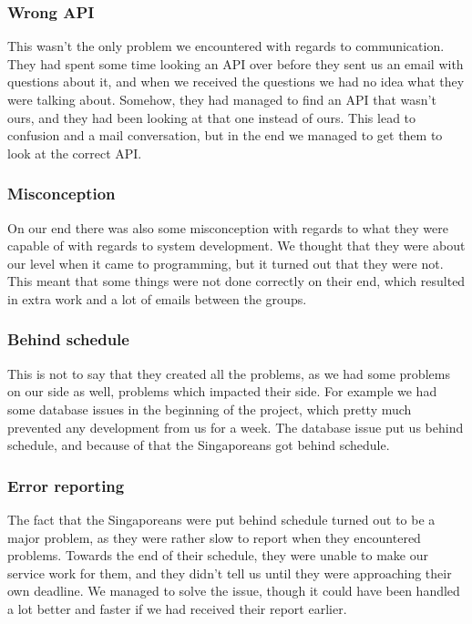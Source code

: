 \subsubsection{Wrong API}
\label{Collaboration_SMU_Conflicts_API}
This wasn't the only problem we encountered with regards to communication. They had spent some time looking an API over before they sent us an email with questions about it, and when we received the questions we had no idea what they were talking about. Somehow, they had managed to find an API that wasn't ours, and they had been looking at that one instead of ours. This lead to confusion and a mail conversation, but in the end we managed to get them to look at the correct API.

\subsubsection{Misconception}
\label{Collaboration_SMU_Conflicts_Misconception}
On our end there was also some misconception with regards to what they were capable of with regards to system development. We thought that they were about our level when it came to programming, but it turned out that they were not. This meant that some things were not done correctly on their end, which resulted in extra work and a lot of emails between the groups.

\subsubsection{Behind schedule}
\label{Collaboration_SMU_Conflicts_Schedule}
This is not to say that they created all the problems, as we had some problems on our side as well, problems which impacted their side. For example we had some database issues in the beginning of the project, which pretty much prevented any development from us for a week. The database issue put us behind schedule, and because of that the Singaporeans got behind schedule.

\subsubsection{Error reporting}
\label{Collaboration_SMU_Conflicts_error}
The fact that the Singaporeans were put behind schedule turned out to be a major problem, as they were rather slow to report when they encountered problems. Towards the end of their schedule, they were unable to make our service work for them, and they didn't tell us until they were approaching their own deadline. We managed to solve the issue, though it could have been handled a lot better and faster if we had received their report earlier.

